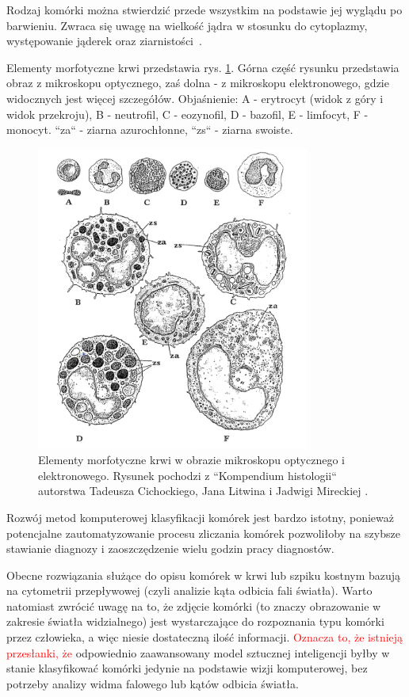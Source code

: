 Rodzaj komórki można stwierdzić przede wszystkim na podstawie jej wyglądu po barwieniu.
Zwraca się uwagę na wielkość jądra w stosunku do cytoplazmy, występowanie jąderek oraz ziarnistości~\cite{histology}.

Elementy morfotyczne krwi przedstawia rys. \ref{fig:electron_microscope}.
Górna część rysunku przedstawia obraz z mikroskopu optycznego, zaś dolna - z mikroskopu elektronowego, gdzie widocznych jest więcej szczegółów.
Objaśnienie: A - erytrocyt (widok z góry i widok przekroju), B - neutrofil, C - eozynofil, D - bazofil, E - limfocyt, F - monocyt. “za“ - ziarna azurochłonne, “zs“
- ziarna swoiste.

\begin{figure}
    \centering
    \includegraphics[width=0.8\textwidth]{morfotyczne}
    \caption{Elementy morfotyczne krwi w obrazie mikroskopu optycznego i elektronowego. Rysunek pochodzi z “Kompendium histologii“ autorstwa Tadeusza Cichockiego, Jana Litwina i Jadwigi Mireckiej \cite{histology}.}
    \label{fig:electron_microscope}
\end{figure}

Rozwój metod komputerowej klasyfikacji komórek jest bardzo istotny, ponieważ potencjalne zautomatyzowanie procesu zliczania komórek pozwoliłoby na szybsze stawianie diagnozy i zaoszczędzenie wielu godzin pracy diagnostów.

Obecne rozwiązania służące do opisu komórek w krwi lub szpiku kostnym bazują na cytometrii przepływowej (czyli analizie kąta odbicia fali światła).
Warto natomiast zwrócić uwagę na to, że zdjęcie komórki (to znaczy obrazowanie w zakresie światła widzialnego) jest wystarczające do rozpoznania typu komórki przez człowieka, a więc niesie dostateczną ilość informacji.
\textcolor{red}{Oznacza to, że istnieją przesłanki, że} odpowiednio zaawansowany model sztucznej inteligencji byłby w stanie klasyfikować komórki jedynie na podstawie wizji komputerowej, bez potrzeby analizy widma falowego lub kątów odbicia światła.


